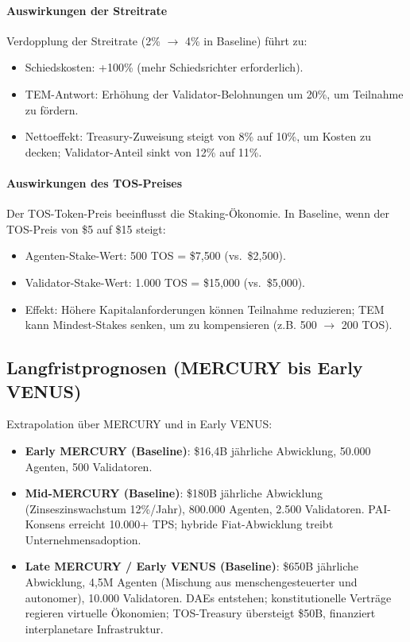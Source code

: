 \documentclass[11pt]{article}
\begin{document}
\paragraph{Auswirkungen der Streitrate}
Verdopplung der Streitrate (2\% $\to$ 4\% in Baseline) führt zu:
\begin{itemize}[noitemsep]
  \item Schiedskosten: +100\% (mehr Schiedsrichter erforderlich).
  \item TEM-Antwort: Erhöhung der Validator-Belohnungen um 20\%, um Teilnahme zu fördern.
  \item Nettoeffekt: Treasury-Zuweisung steigt von 8\% auf 10\%, um Kosten zu decken; Validator-Anteil sinkt von 12\% auf 11\%.
\end{itemize}

\paragraph{Auswirkungen des TOS-Preises}
Der TOS-Token-Preis beeinflusst die Staking-Ökonomie. In Baseline, wenn der TOS-Preis von \$5 auf \$15 steigt:
\begin{itemize}[noitemsep]
  \item Agenten-Stake-Wert: 500 TOS = \$7{,}500 (vs.\ \$2{,}500).
  \item Validator-Stake-Wert: 1.000 TOS = \$15{,}000 (vs.\ \$5{,}000).
  \item Effekt: Höhere Kapitalanforderungen können Teilnahme reduzieren; TEM kann Mindest-Stakes senken, um zu kompensieren (z.B. 500 $\to$ 200 TOS).
\end{itemize}

\subsection{Langfristprognosen (MERCURY bis Early VENUS)}
Extrapolation über MERCURY und in Early VENUS:
\begin{itemize}[noitemsep]
  \item \textbf{Early MERCURY (Baseline)}: \$16,4B jährliche Abwicklung, 50.000 Agenten, 500 Validatoren.
  \item \textbf{Mid-MERCURY (Baseline)}: \$180B jährliche Abwicklung (Zinseszinswachstum 12\%/Jahr), 800.000 Agenten, 2.500 Validatoren. PAI-Konsens erreicht 10.000+ TPS; hybride Fiat-Abwicklung treibt Unternehmensadoption.
  \item \textbf{Late MERCURY / Early VENUS (Baseline)}: \$650B jährliche Abwicklung, 4,5M Agenten (Mischung aus menschengesteuerter und autonomer), 10.000 Validatoren. DAEs entstehen; konstitutionelle Verträge regieren virtuelle Ökonomien; TOS-Treasury übersteigt \$50B, finanziert interplanetare Infrastruktur.
\end{itemize}
\end{document}
